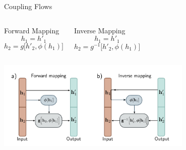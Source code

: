 \documentclass[aspectratio=169,xcolor=dvipsnames]{beamer}
\begin{document}
\begin{frame}{Coupling Flows}
\begin{columns}[T,onlytextwidth]
  \begin{block}{Forward Mapping}
    \[
    h_1 = h'_1
    \]
    \[
    h_2 = g\bigl[h'_2, \phi(h_1)\bigr]
    \]
  \end{block}

  \begin{block}{Inverse Mapping}
    \[
    h_1 = h'_1
    \]
    \[
    h_2 = g^{-1}\bigl[h'_2, \phi(h_1)\bigr]
    \]
  \end{block}
\end{columns}

\vspace{0.4cm}

\begin{center}
  \includegraphics[width=0.7\textwidth]{pictures/couplingflows.png}
\end{center}

\end{frame}
\end{document}
